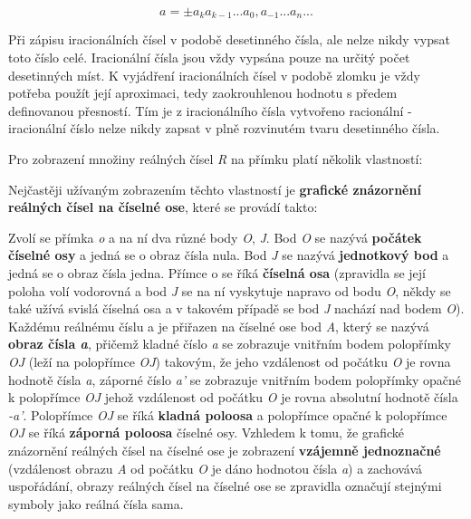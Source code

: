 $$ a =  \pm a_k  a_{k-1} ... a_0,a_{-1} ...a_{n}... $$

Při zápisu iracionálních čísel v podobě desetinného čísla, ale nelze nikdy vypsat toto číslo celé. Iracionální čísla jsou vždy vypsána pouze na určitý počet desetinných míst. K vyjádření iracionálních čísel v podobě zlomku je vždy potřeba použít její aproximaci, tedy zaokrouhlenou hodnotu s předem definovanou přesností. Tím je z iracionálního čísla vytvořeno racionální - iracionální číslo nelze nikdy zapsat v plně rozvinutém tvaru desetinného čísla.


Pro zobrazení množiny reálných čísel {\it R} na přímku platí několik vlastností:

\vskip 4mm
\vskip 4mm

Nejčastěji užívaným zobrazením těchto vlastností je {\bf grafické znázornění reálných čísel na číselné ose}, které se provádí takto:

Zvolí se přímka {\it o} a na ní dva různé body {\it O}, {\it J}. Bod {\it O} se nazývá {\bf počátek číselné osy} a jedná se o obraz čísla nula. Bod {\it J} se nazývá {\bf jednotkový bod} a jedná se o obraz čísla jedna. Přímce o se říká {\bf číselná osa} (zpravidla se její poloha volí vodorovná a bod {\it J} se na ní vyskytuje napravo od bodu {\it O}, někdy se také užívá svislá číselná osa a v takovém případě se bod {\it J} nachází nad bodem {\it O}). Každému reálnému číslu a je přiřazen na číselné ose bod {\it A}, který se nazývá {\bf obraz čísla {\it a}}, přičemž kladné číslo {\it a} se zobrazuje vnitřním bodem polopřímky {\it OJ} (leží na polopřímce {\it OJ}) takovým, že jeho vzdálenost od počátku {\it O} je rovna hodnotě čísla {\it a}, záporné číslo {\it a'} se zobrazuje vnitřním bodem polopřímky opačné k polopřímce {\it OJ} jehož vzdálenost od počátku {\it O} je rovna absolutní hodnotě čísla {\it-a'}. Polopřímce {\it OJ} se říká {\bf kladná poloosa} a polopřímce opačné k polopřímce {\it OJ} se říká {\bf záporná poloosa} číselné osy. Vzhledem k tomu, že grafické znázornění reálných čísel na číselné ose je zobrazení {\bf vzájemně jednoznačné} (vzdálenost obrazu {\it A} od počátku {\it O} je dáno hodnotou čísla {\it a}) a zachovává uspořádání, obrazy reálných čísel na číselné ose se zpravidla označují stejnými symboly jako reálná čísla sama.

